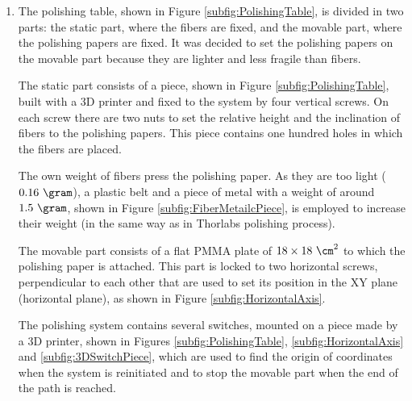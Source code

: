 \begin{enumerate}
\item{} The polishing table, shown in Figure \ref{subfig:PolishingTable}, is divided in two parts: the static part, where the fibers are fixed, and the movable part, where the polishing papers are fixed. It was decided to set the polishing papers on the movable part because they are lighter and less fragile than fibers.

The static part consists of a piece, shown in Figure \ref{subfig:PolishingTable}, built with a 3D printer and fixed to the system by four vertical screws. On each screw there are two nuts to set the relative height and the inclination of fibers to the polishing papers. This piece contains one hundred holes in which the fibers are placed. 

The own weight of fibers press the polishing paper. As they are too light ($0.16~\gram$), a plastic belt and a piece of metal with a weight of around $1.5~\gram$, shown in Figure \ref{subfig:FiberMetailcPiece}, is employed to increase their weight (in the same way as in Thorlabs polishing process).

The movable part consists of a flat PMMA plate of $18 \times 18~\cm^2$ to which the polishing paper is attached. This part is locked to two horizontal screws, perpendicular to each other that are used to set its position in the XY plane (horizontal plane), as shown in Figure \ref{subfig:HorizontalAxis}.

The polishing system contains several switches,  mounted on a piece made by a 3D printer, shown in Figures \ref{subfig:PolishingTable}, \ref{subfig:HorizontalAxis} and \ref{subfig:3DSwitchPiece}, which are used to find the origin of coordinates when the system is reinitiated and to stop the movable part when the end of the path is reached. 


\end{enumerate}
